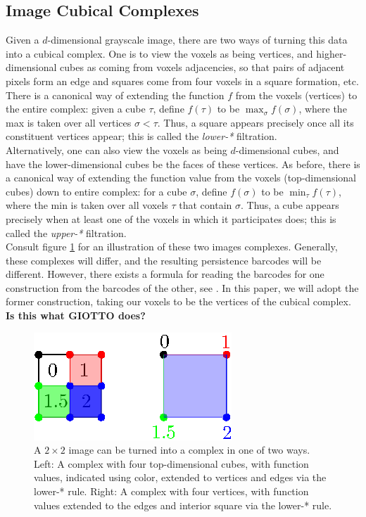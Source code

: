 \documentclass[conference]{IEEEtran}
\theoremstyle{definition}
\numberwithin{figure}{section}
\begin{document}
\subsection{Image Cubical Complexes}
Given a $d$-dimensional grayscale image, there are two ways of turning this data into a cubical complex. One is to view the voxels as being vertices, and higher-dimensional cubes as coming from voxels adjacencies, so that pairs of adjacent pixels form an edge and squares come from four voxels in a square formation, etc. There is a canonical way of extending the function $f$ from the voxels (vertices) to the entire complex: given a cube $\tau$, define $f(\tau)$ to be $\max_{\sigma} f(\sigma)$, where the max is taken over all vertices $\sigma < \tau$. Thus, a square appears precisely once all its constituent vertices appear; this is called the \emph{lower-*} filtration.\\

Alternatively, one can also view the voxels as being $d$-dimensional cubes, and have the lower-dimensional cubes be the faces of these vertices. As before, there is a canonical way of extending the function value from the voxels (top-dimensional cubes) down to entire complex: for a cube $\sigma$, define $f(\sigma)$ to be $\min_{\tau} f(\tau)$, where the min is taken over all voxels $\tau$ that contain $\sigma$. Thus, a cube appears precisely when at least one of the voxels in which it participates does;  this is called the \emph{upper-*} filtration.\\ 

Consult figure \ref{fig:image_to_complex} for an illustration of these two images complexes. Generally, these complexes will differ, and the resulting persistence barcodes will be different. However, there exists a formula for reading the barcodes for one construction from the barcodes of the other, see \cite{bleile2021persistent}. In this paper, we will adopt the former construction, taking our voxels to be the vertices of the cubical complex. {\bf Is this what GIOTTO does?}


\begin{figure}
	\centering
	\includegraphics[scale=2]{image_to_complex.eps}
	\caption{A $2 \times 2$ image can be turned into a complex in one of two ways. Left: A complex with four top-dimensional cubes, with function values, indicated using color, extended to vertices and edges via the lower-* rule. Right: A complex with four vertices, with function values extended to the edges and interior square via the lower-* rule.}
	\label{fig:image_to_complex}
\end{figure}
\end{document}
